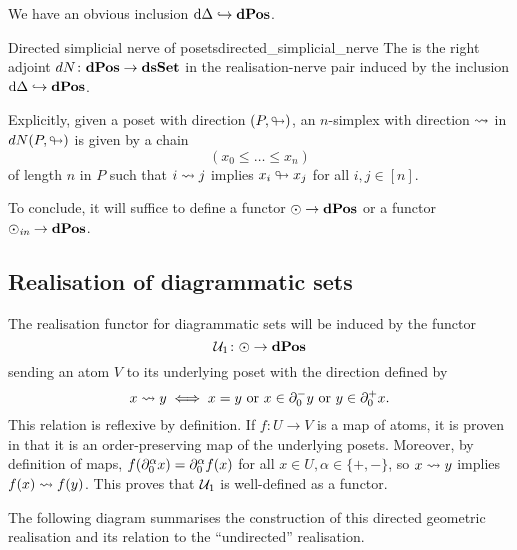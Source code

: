 We have an obvious inclusion \( \mathrm{d}\Delta \hookrightarrow \mathbf{dPos} \).

\begin{cdef}{Directed simplicial nerve of posets}{directed_simplicial_nerve}
	The  is the right adjoint \( dN\colon \mathbf{dPos} \to \mathbf{dsSet} \) in the realisation-nerve pair induced by the inclusion \( \mathrm{d}\Delta \hookrightarrow \mathbf{dPos} \).
\end{cdef}

Explicitly, given a poset with direction \( (P, \looparrowright) \), an \( n \)-simplex with direction \( \rightsquigarrow \) in \( dN(P, \looparrowright) \) is given by a chain
\begin{equation*}
	(x_0 \leq \ldots \leq x_n)
\end{equation*}
of length \( n \) in \( P \) such that \( i \rightsquigarrow j \) implies \( x_i \looparrowright x_j \) for all \( i, j \in [n] \).

To conclude, it will suffice to define a functor \( \odot \to \mathbf{dPos} \) or a functor \( \odot_\textit{in} \to \mathbf{dPos} \).


\subsection{Realisation of diagrammatic sets}

The realisation functor for diagrammatic sets will be induced by the functor
\begin{equation*}
	\mathcal{U}_1\colon \odot \to \mathbf{dPos}
\end{equation*}
sending an atom \( V \) to its underlying poset with the direction defined by
\begin{equation*}
	x \rightsquigarrow y \iff x = y \text{ or } x \in \partial_{0}^{-}y \text{ or } y \in \partial_{0}^{+}x.
\end{equation*}
This relation is reflexive by definition.
If \( f\colon U \to V \) is a map of atoms, it is proven in \cite[Lemma 1.9]{hadzihasanovic_diagrammatic_2020} that it is an order-preserving map of the underlying posets.
Moreover, by definition of maps, \( f(\partial_{0}^{\alpha}x) = \partial_{0}^{\alpha}f(x) \) for all \( x \in U, \alpha \in \{ +, - \} \), so \( x \rightsquigarrow y \) implies \( f(x) \rightsquigarrow f(y) \).
This proves that \( \mathcal{U}_1 \) is well-defined as a functor.

The following diagram summarises the construction of this directed geometric realisation and its relation to the ``undirected'' realisation.

